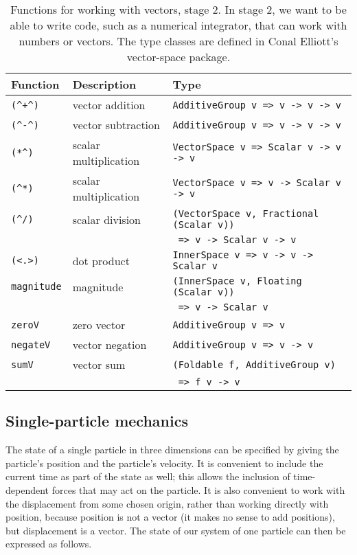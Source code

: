\documentclass[11pt]{article}
\begin{document}
\begin{table}
\begin{center}
\begin{tabular}{lll}
Function      & Description           & Type \\ \hline
\verb|(^+^)| & vector addition       & \verb|AdditiveGroup v => v -> v -> v| \\
\verb|(^-^)| & vector subtraction    & \verb|AdditiveGroup v => v -> v -> v| \\
\verb|(*^)|  & scalar multiplication & \verb|VectorSpace v => Scalar v -> v -> v| \\
\verb|(^*)|  & scalar multiplication & \verb|VectorSpace v => v -> Scalar v -> v| \\
\verb|(^/)|  & scalar division       & \verb|(VectorSpace v, Fractional (Scalar v))| \\
              &                      & \verb| => v -> Scalar v -> v| \\
\verb|(<.>)| & dot product           & \verb|InnerSpace v => v -> v -> Scalar v| \\
\verb|magnitude| & magnitude        & \verb|(InnerSpace v, Floating (Scalar v))| \\
              &                      & \verb| => v -> Scalar v| \\
\verb|zeroV| & zero vector          & \verb|AdditiveGroup v => v| \\
\verb|negateV| & vector negation    & \verb|AdditiveGroup v => v -> v| \\
\verb|sumV|   & vector sum          & \verb|(Foldable f, AdditiveGroup v)| \\
               &                     & \verb| => f v -> v| \\
\end{tabular}
\end{center}
\caption{Functions for working with vectors, stage 2.
In stage 2, we want to be able to write code, such as a numerical integrator,
that can work with numbers or vectors.
The type classes are defined in Conal Elliott's vector-space package\cite{vector-space}.
}
\label{vectorfunctionsstage2}
\end{table}

\subsection{Single-particle mechanics}

The state of a single particle in three dimensions can be specified by giving
the particle's position and the particle's velocity.
It is convenient to include the current time as part of the state as well;
this allows the inclusion of time-dependent forces that may act
on the particle.  It is also convenient to work with the displacement
from some chosen origin, rather than working directly with position,
because position is not a vector (it makes no sense to add positions),
but displacement is a vector.  The state of our system of one particle
can then be expressed as follows.
\end{document}
